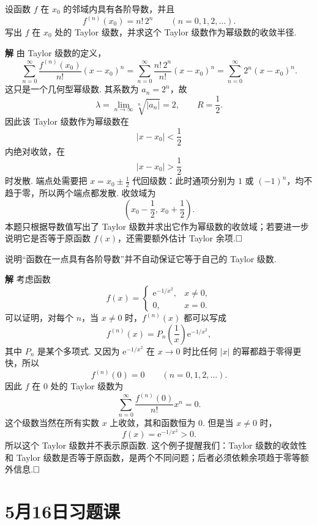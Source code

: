 \documentclass{ctexart}
\newcounter{EnvironmentCounter}
\newcommand{\renewEnvironmentCounter}{\setcounter{EnvironmentCounter}{0}}
\newenvironment{custom}[1]{\par\noindent \textbf{#1}\quad}{\par\vspace{1em}}
\begin{document}
\begin{example}
设函数 $f$ 在 $x_0$ 的邻域内具有各阶导数，并且
\[
f^{(n)}(x_0)=n!\,2^n\qquad (n=0,1,2,\ldots).
\]
写出 $f$ 在 $x_0$ 处的 Taylor 级数，并求这个 Taylor 级数作为幂级数的收敛半径.
\end{example}

\begin{custom}{解}
由 Taylor 级数的定义，
\[
\sum_{n=0}^{\infty}\frac{f^{(n)}(x_0)}{n!}(x-x_0)^n
=
\sum_{n=0}^{\infty}\frac{n!\,2^n}{n!}(x-x_0)^n
=
\sum_{n=0}^{\infty}2^n(x-x_0)^n.
\]
这只是一个几何型幂级数. 其系数为 $a_n=2^n$，故
\[
\lambda=\lim_{n\to\infty}\sqrt[n]{|a_n|}=2,
\qquad
R=\frac12.
\]
因此该 Taylor 级数作为幂级数在
\[
|x-x_0|<\frac12
\]
内绝对收敛，在
\[
|x-x_0|>\frac12
\]
时发散. 端点处需要把 $x=x_0\pm\frac12$ 代回级数：此时通项分别为 $1$ 或 $(-1)^n$，均不趋于零，所以两个端点都发散. 收敛域为
\[
\left(x_0-\frac12,\,x_0+\frac12\right).
\]
本题只根据导数值写出了 Taylor 级数并求出它作为幂级数的收敛域；若要进一步说明它是否等于原函数 $f(x)$，还需要额外估计 Taylor 余项.$\hfill{\square}$
\end{custom}

\begin{example}
说明“函数在一点具有各阶导数”并不自动保证它等于自己的 Taylor 级数.
\end{example}

\begin{custom}{解}
考虑函数
\[
f(x)=
\begin{cases}
\mathrm{e}^{-1/x^2}, & x\neq0,\\
0, & x=0.
\end{cases}
\]
可以证明，对每个 $n$，当 $x\neq0$ 时，$f^{(n)}(x)$ 都可以写成
\[
f^{(n)}(x)=P_n\left(\frac1x\right)\mathrm{e}^{-1/x^2},
\]
其中 $P_n$ 是某个多项式. 又因为 $\mathrm{e}^{-1/x^2}$ 在 $x\to0$ 时比任何 $|x|$ 的幂都趋于零得更快，所以
\[
f^{(n)}(0)=0\qquad(n=0,1,2,\ldots).
\]
因此 $f$ 在 $0$ 处的 Taylor 级数为
\[
\sum_{n=0}^{\infty}\frac{f^{(n)}(0)}{n!}x^n=0.
\]
这个级数当然在所有实数 $x$ 上收敛，其和函数恒为 $0$. 但是当 $x\neq0$ 时，
\[
f(x)=\mathrm{e}^{-1/x^2}>0.
\]
所以这个 Taylor 级数并不表示原函数. 这个例子提醒我们：Taylor 级数的收敛性和 Taylor 级数是否等于原函数，是两个不同问题；后者必须依赖余项趋于零等额外信息.$\hfill{\square}$
\end{custom}

\clearpage
\renewEnvironmentCounter
\section{5月16日习题课}
\end{document}
